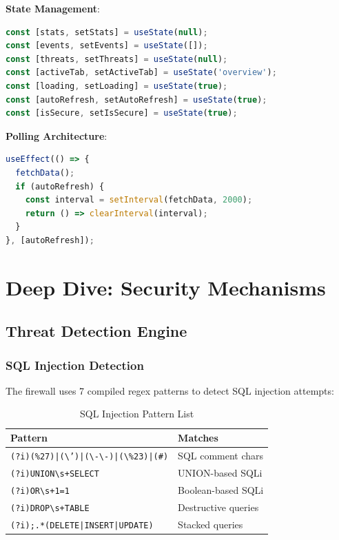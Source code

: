 \documentclass[11pt,a4paper]{report}
\begin{document}
\textbf{State Management}:
\begin{lstlisting}[language=JavaScript, caption=React State Hooks (Lines 9-16)]
const [stats, setStats] = useState(null);
const [events, setEvents] = useState([]);
const [threats, setThreats] = useState(null);
const [activeTab, setActiveTab] = useState('overview');
const [loading, setLoading] = useState(true);
const [autoRefresh, setAutoRefresh] = useState(true);
const [isSecure, setIsSecure] = useState(true);
\end{lstlisting}

\textbf{Polling Architecture}:
\begin{lstlisting}[language=JavaScript, caption=2-Second Polling Loop (Lines 61-67)]
useEffect(() => {
  fetchData();
  if (autoRefresh) {
    const interval = setInterval(fetchData, 2000);
    return () => clearInterval(interval);
  }
}, [autoRefresh]);
\end{lstlisting}

\chapter{Deep Dive: Security Mechanisms}

\section{Threat Detection Engine}

\subsection{SQL Injection Detection}
The firewall uses 7 compiled regex patterns to detect SQL injection attempts:

\begin{table}[H]
\centering
\begin{tabular}{@{}p{7cm}l@{}}
\toprule
\textbf{Pattern} & \textbf{Matches} \\ \midrule
\texttt{(?i)(\%27)|(\textbackslash')|(\textbackslash-\textbackslash-)|(\textbackslash\%23)|(#)} & SQL comment chars \\ 
\texttt{(?i)UNION\textbackslash s+SELECT} & UNION-based SQLi \\
\texttt{(?i)OR\textbackslash s+1=1} & Boolean-based SQLi \\
\texttt{(?i)DROP\textbackslash s+TABLE} & Destructive queries \\
\texttt{(?i);.*(DELETE|INSERT|UPDATE)} & Stacked queries \\ \bottomrule
\end{tabular}
\caption{SQL Injection Pattern List}
\end{table}
\end{document}
